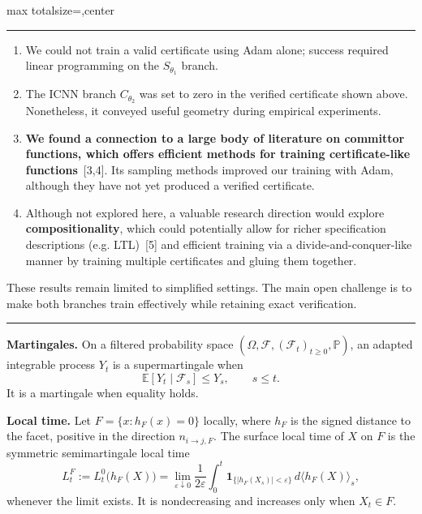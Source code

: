\documentclass[10pt]{article}
\newcommand{\titlefont}{\bfseries}
\newcommand{\postersection}[1]{%
  \vspace{1.1mm}{\raggedright\fontsize{16}{18}\selectfont\titlefont
  \textcolor{AccentDark}{#1}\par}\vspace{.45mm}
  \textcolor{Rule}{\rule{\linewidth}{0.7pt}}\vspace{.7mm}}
\begin{document}
\begin{adjustbox}{max totalsize={\textwidth}{\textheight},center}
\begin{minipage}{\textwidth}
\begin{minipage}[t]{.322\textwidth}
\postersection{Limitations and future work}
\begin{enumerate}
\item We could not train a valid certificate using Adam alone; success
required linear programming on the $S_{\theta_1}$ branch.
\item The ICNN branch $C_{\theta_2}$ was set to zero in the verified certificate shown above. 
Nonetheless, it conveyed useful geometry during empirical experiments.
\item \textbf{We found a connection to a large body of literature on committor
functions, which offers efficient methods for training certificate-like
functions}~[3,4]. Its sampling methods improved our training with Adam,
although they have not yet produced a verified certificate.
\item Although not explored here, a valuable research direction would explore
\textbf{compositionality}, which could potentially allow for richer specification 
descriptions (e.g. LTL)~[5] and efficient training via a divide-and-conquer-like manner 
by training multiple certificates and gluing them together.  
\end{enumerate}


These results remain limited to simplified settings. The main open challenge
is to make both branches train effectively while retaining exact verification.

\postersection{Mathematical background}
\textbf{Martingales.} On a filtered probability space
$(\Omega,\mathcal F,(\mathcal F_t)_{t\geq0},\mathbb P)$, an adapted integrable
process $Y_t$ is a supermartingale when
\[
 \mathbb E[Y_t\mid\mathcal F_s]\leq Y_s,\qquad s\leq t.
\]
It is a martingale when equality holds.



\textbf{Local time.} Let $F=\{x:h_F(x)=0\}$ locally, where $h_F$ is the
signed distance to the facet, positive in the direction $n_{i\to j,F}$.
The surface local time of $X$ on $F$ is the symmetric semimartingale local
time
\[
 L_t^F:=L_t^0\!\bigl(h_F(X)\bigr)
 =\lim_{\varepsilon\downarrow0}\frac{1}{2\varepsilon}
 \int_0^t\mathbf 1_{\{|h_F(X_s)|<\varepsilon\}}\,
 d\langle h_F(X)\rangle_s,
\]
whenever the limit exists. It is nondecreasing and increases only when
$X_t\in F$.


\end{minipage}
\end{minipage}
\end{adjustbox}
\end{document}
